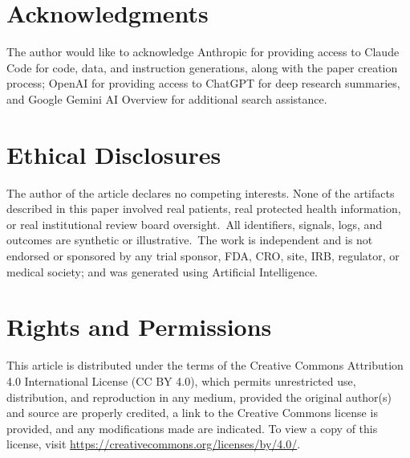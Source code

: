 %

{}
\section*{Acknowledgments}
\label{sec:acknowledgments}
\vspace{-0.15cm}
The author would like to acknowledge Anthropic for providing access to
Claude Code for code, data, and instruction generations, along with
the paper creation process; OpenAI for providing access to ChatGPT
for deep research summaries, and Google Gemini AI Overview for
additional search assistance.

\vspace{-0.1cm}

{}
\section*{Ethical Disclosures}
\label{sec:ethics}
\vspace{-0.15cm}
The author of the article declares no competing interests. None of
the artifacts described in this paper involved real patients, real
protected health information, or real institutional review board
oversight.\ All identifiers, signals, logs, and outcomes are
synthetic or illustrative.\ The work is independent and is not
endorsed or sponsored by any trial sponsor, FDA, CRO, site, IRB,
regulator, or medical society; and was generated using Artificial
Intelligence.

\vspace{-0.1cm}

{}
\section*{Rights and Permissions}
\label{sec:rights}
\vspace{-0.15cm}
This article is distributed under the terms of the Creative Commons
Attribution 4.0 International License (CC BY 4.0), which permits
unrestricted use, distribution, and reproduction in any medium,
provided the original author(s) and source are properly credited, a
link to the Creative Commons license is provided, and any
modifications made are indicated. To view a copy of this license,
visit \url{https://creativecommons.org/licenses/by/4.0/}.

